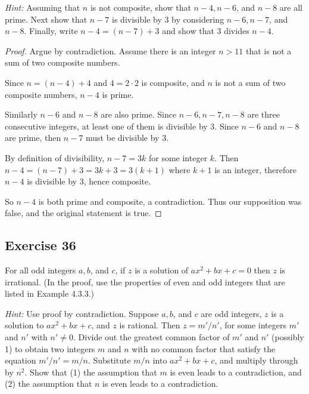 \documentclass[14pt]{extarticle}
\begin{document}
    {\it Hint:} Assuming that $n$ is not composite, show that
$n - 4, n - 6$, and $n - 8$ are all prime. Next show that
$n - 7$ is divisible by 3 by considering $n - 6, n - 7$,
and $n - 8$. Finally, write $n - 4 = (n - 7) + 3$ and show
that 3 divides $n - 4$.

\begin{proof}
    Argue by contradiction. Assume there is an integer $n > 11$ that is not a sum of two composite numbers.

    Since $n = (n-4) + 4$ and $4 = 2 \cdot 2$ is composite, and $n$ is not a sum of two composite numbers, $n-4$ is prime.

    Similarly $n-6$ and $n-8$ are also prime. Since $n-6, n-7, n-8$ are three consecutive integers, at least one of them is divisible by 3. Since $n-6$ and $n-8$ are prime, then $n-7$ must be divisible by 3.

    By definition of divisibility, $n-7 = 3k$ for some integer $k$. Then $n-4 = (n-7)+3 = 3k+3 = 3(k+1)$ where $k+1$ is an integer, therefore $n-4$ is divisible by 3, hence composite.

    So $n-4$ is both prime and composite, a contradiction. Thus our supposition was false, and the original statement is true.
\end{proof}

\subsection{Exercise 36}
For all odd integers $a, b$, and $c$, if $z$ is a solution of $ax^2 + bx + c = 0$ then $z$ is irrational. (In the proof, use the properties of even and odd integers that
are listed in Example 4.3.3.)

{\it Hint:} Use proof by contradiction. Suppose $a, b$, and $c$ are odd integers, $z$ is a solution to $ax^2 + bx + c$, and $z$ is rational. Then $z = m'/n'$, for some integers $m'$ and $n'$ with $n' \neq 0$. Divide out the greatest common factor of $m'$ and $n'$ (possibly 1) to obtain two integers $m$ and $n$ with no common factor that satisfy the equation $m'/n' = m/n$. Substitute $m/n$ into $ax^2 + bx + c$, and multiply through by $n^2$. Show that (1) the assumption that $m$ is even leads to a contradiction, and (2) the assumption that $n$ is even leads to a contradiction.
\end{document}

